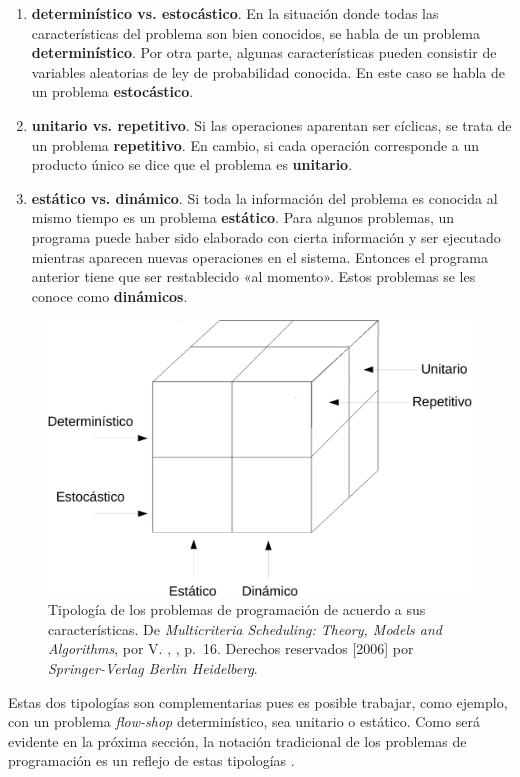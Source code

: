 \documentclass[spanish,draft,12pt,headsepline,footsepline,paper=letter]{scrreprt}
\begin{document}
\begin{enumerate}[1]
\item \textbf{determinístico vs. estocástico}. En la situación donde todas las características del problema son bien conocidos, se habla de un problema \textbf{determinístico}. Por otra parte, algunas características pueden consistir de variables aleatorias de ley de probabilidad conocida. En este caso se habla de un problema \textbf{estocástico}.
\item \textbf{unitario vs. repetitivo}. Si las operaciones aparentan ser cíclicas, se trata de un problema \textbf{repetitivo}. En cambio, si cada operación corresponde a un producto único se dice que el problema es \textbf{unitario}.
\item \textbf{estático vs. dinámico}. Si toda la información del problema es conocida al mismo tiempo es un problema \textbf{estático}. Para algunos problemas, un programa puede haber sido elaborado con cierta información y ser ejecutado mientras aparecen nuevas operaciones en el sistema. Entonces el programa anterior tiene que ser restablecido «al momento». Estos problemas se les conoce como \textbf{dinámicos}.
\end{enumerate}

\begin{figure}[hbtp]
\centering
\includegraphics[width=.8\textwidth]{media/typology_cubic.pdf}
\caption[Tipología basada en características]{Tipología de los problemas de programación de acuerdo a sus características. De \textit{Multicriteria Scheduling: Theory, Models and Algorithms}, por V. \citeauthor{TKindt2002}, \citeyear{TKindt2002}, p.~16. Derechos reservados [2006] por \textit{Springer-Verlag Berlin Heidelberg}.}
\label{fig:typology_cubic}
\end{figure}

Estas dos tipologías son complementarias pues es posible trabajar, como ejemplo, con un problema \textit{flow-shop} determinístico, sea unitario o estático. Como será evidente en la próxima sección, la notación tradicional de los problemas de programación es un reflejo de estas tipologías \citep[p.~16]{TKindt2002}.
\end{document}
